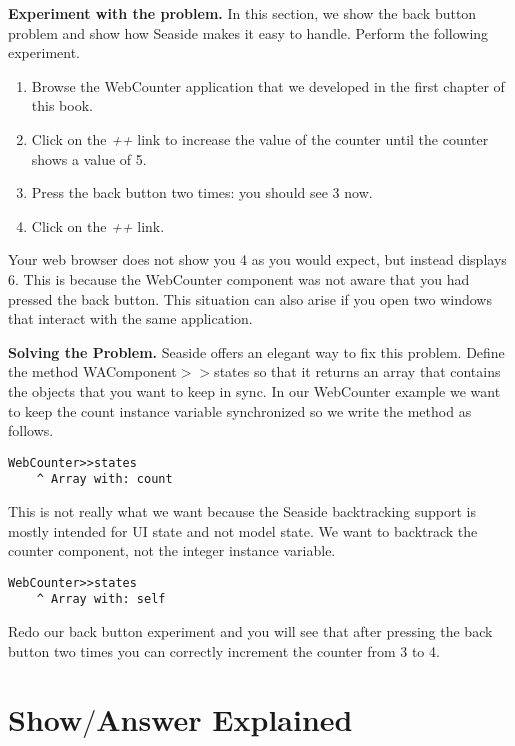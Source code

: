 \documentclass[a4paper,10pt,twoside]{book}
\newcommand{\ct}[1]{{\small\ttfamily\textup{#1}}}
\begin{document}
\textbf{Experiment with the problem.} In this section, we show the back button problem and show how Seaside makes it easy to handle. Perform the following experiment.

\begin{enumerate}
\item  Browse the \ct{WebCounter} application that we developed in the first chapter of this book.
\item  Click on the \textit{++} link to increase the value of the counter until the counter shows a value of 5.
\item  Press the back button two times: you should see 3 now.
\item  Click on the \textit{++} link.
\end{enumerate}

Your web browser does not show you 4 as you would expect, but instead displays 6. This is because the \ct{WebCounter} component was not aware that you had pressed the back button. This situation can also arise if you open two windows that interact with the same application.

\textbf{Solving the Problem.} Seaside offers an elegant way to fix this problem. Define the method  \ct{WAComponent$>$$>$states} so that it returns an array that contains the objects that you want to keep in sync. In our \ct{WebCounter} example we want to keep the count instance variable synchronized so we write the method as follows.

\begin{lstlisting}
WebCounter>>states
    ^ Array with: count
\end{lstlisting}

This is not really what we want because the Seaside backtracking support is mostly intended for UI state and not model state. We want to backtrack the counter component, not the integer instance variable.

\begin{lstlisting}
WebCounter>>states
    ^ Array with: self
\end{lstlisting}

Redo our back button experiment and you will see that after pressing the back button two times you can correctly increment the counter from 3 to 4.

\section{Show$/$Answer Explained}
\label{book:components:calling:showanswer}
\end{document}
